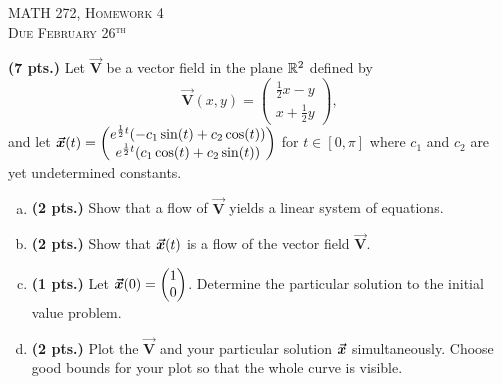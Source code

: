 \documentclass[12pt]{article} %
\newcommand{\vecfieldV}{\boldsymbol{\vec{V}}}
\begin{document}
\begin{center}
   \textsc{\large MATH 272, Homework 4}\\
   \textsc{Due February 26$^\textrm{th}$}
\end{center}
\vspace{.5cm}

\begin{problem}
\textbf{(7 pts.)} Let $\vecfieldV$ be a vector field in the plane $\mathbb{R}^2$ defined by
\[
\vecfieldV(x,y) = \begin{pmatrix} \frac{1}{2}x-y \\ x + \frac{1}{2}y \end{pmatrix},
\]
and let $\boldsymbol{\vec{x}}(t) = \begin{pmatrix}  e^{\frac{1}{2}t} (-c_1 \sin(t) + c_2 \cos(t) ) \\ e^{\frac{1}{2}t} (c_1 \cos(t) + c_2 \sin(t)) \end{pmatrix}$ for $t\in [0,\pi]$ where $c_1$ and $c_2$ are yet undetermined constants.
\begin{enumerate}[(a)]
    \item \textbf{(2 pts.)} Show that a flow of $\vecfieldV$ yields a linear system of equations.
    \item \textbf{(2 pts.)} Show that $\boldsymbol{\vec{x}}(t)$ is a flow of the vector field $\vecfieldV$.
    \item \textbf{(1 pts.)} Let $\boldsymbol{\vec{x}}(0)=\begin{pmatrix} 1 \\ 0 \end{pmatrix}$. Determine the particular solution to the initial value problem.
    \item \textbf{(2 pts.)} Plot the $\vecfieldV$ and your particular solution $\boldsymbol{\vec{x}}$ simultaneously. Choose good bounds for your plot so that the whole curve is visible.
\end{enumerate}
\end{problem}
\end{document}
